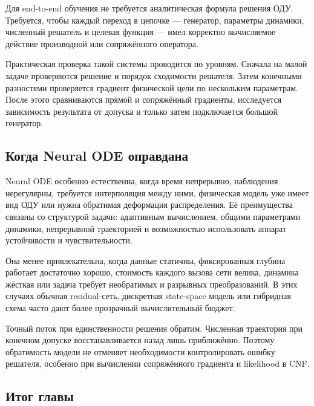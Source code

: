 \begin{principle}
\label{pr:differentiable-design-chain-v06}
Для end-to-end обучения не требуется аналитическая формула решения ОДУ. Требуется, чтобы каждый переход в цепочке --- генератор, параметры динамики, численный решатель и целевая функция --- имел корректно вычисляемое действие производной или сопряжённого оператора.
\end{principle}

Практическая проверка такой системы проводится по уровням. Сначала на малой задаче проверяются решение и порядок сходимости решателя. Затем конечными разностями проверяется градиент физической цели по нескольким параметрам. После этого сравниваются прямой и сопряжённый градиенты, исследуется зависимость результата от допуска и только затем подключается большой генератор.

\subsection{Когда Neural ODE оправдана}

Neural ODE особенно естественна, когда время непрерывно, наблюдения нерегулярны, требуется интерполяция между ними, физическая модель уже имеет вид ОДУ или нужна обратимая деформация распределения. Её преимущества связаны со структурой задачи: адаптивным вычислением, общими параметрами динамики, непрерывной траекторией и возможностью использовать аппарат устойчивости и чувствительности.

Она менее привлекательна, когда данные статичны, фиксированная глубина работает достаточно хорошо, стоимость каждого вызова сети велика, динамика жёсткая или задача требует необратимых и разрывных преобразований. В этих случаях обычная residual-сеть, дискретная state-space модель или гибридная схема часто дают более прозрачный вычислительный бюджет.

\begin{caution}
Точный поток при единственности решения обратим. Численная траектория при конечном допуске восстанавливается назад лишь приближённо. Поэтому обратимость модели не отменяет необходимости контролировать ошибку решателя, особенно при вычислении сопряжённого градиента и likelihood в CNF.
\end{caution}

\subsection{Итог главы}

